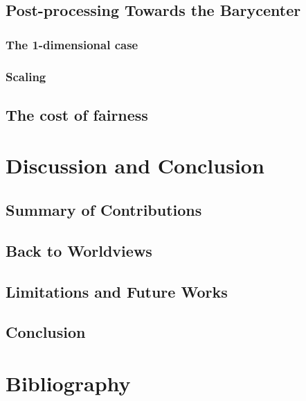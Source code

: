 \documentclass[
  a4paper,
  11pt,
  a4paper,
  twoside,
  openright]{report}
\begin{document}
\section{Post-processing Towards the
Barycenter}\label{post-processing-towards-the-barycenter-1}

\subsection{The 1-dimensional case}\label{the-1-dimensional-case-1}

\subsection{Scaling}\label{scaling-1}

\section{The cost of fairness}\label{the-cost-of-fairness-1}


\chapter{Discussion and Conclusion}\label{discussion-and-conclusion}

\section{Summary of Contributions}\label{summary-of-contributions}

\section{Back to Worldviews}\label{back-to-worldviews}

\section{Limitations and Future
Works}\label{limitations-and-future-works}

\section{Conclusion}\label{conclusion}


\chapter*{Bibliography}\label{bibliography}
\end{document}
